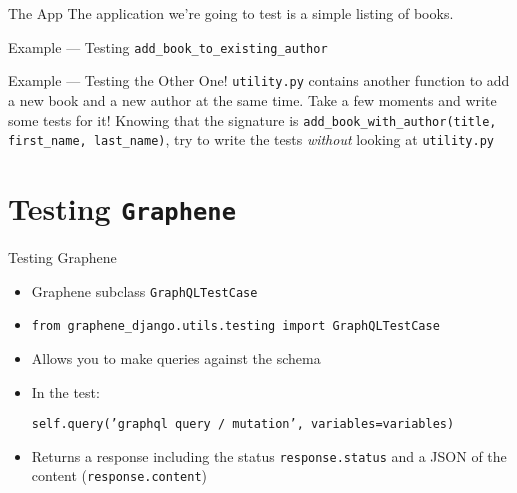 \documentclass[t]{beamer}
\newcommand{\code}[1]{\texttt{#1}}
\begin{document}
	\begin{frame}{The App}
		The application we're going to test is a simple listing of books.

		
	\end{frame}

	\begin{frame}{Example --- Testing \code{add\_book\_to\_existing\_author}}
		

		\framebreak

		

		\framebreak

		

	\end{frame}

	\begin{frame}{Example --- Testing the Other One!}
		\code{utility.py} contains another function to add a new book and a new author at the same time. Take a few moments and write some tests for it! Knowing that the signature is \code{add\_book\_with\_author(title, first\_name, last\_name)}, try to write the tests \emph{without} looking at \code{utility.py}

		\framebreak

		
	\end{frame}


	\section{Testing \code{Graphene}}

	\begin{frame}{Testing Graphene}
		\begin{itemize}
			\item Graphene subclass \code{GraphQLTestCase}
			\item \code{from graphene\_django.utils.testing import GraphQLTestCase}
			\item Allows you to make queries against the schema
			\item In the test:

				\code{self.query('graphql query / mutation', variables=variables)}
			\item Returns a response including the status \code{response.status} and a JSON of the content (\code{response.content})
		\end{itemize}
	\end{frame}
\end{document}
